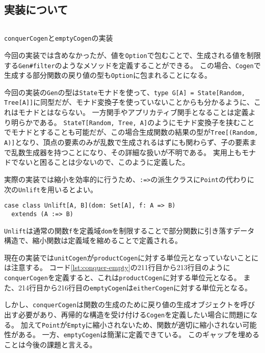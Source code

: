 \documentclass[submit,PRO]{ipsj}
\theoremstyle{definition}
\begin{document}
\subsection{実装について}

\begin{listing*}[hbt]
  \inputminted[breaklines,autogobble,linenos,firstline=211,lastline=216]{scala}{../src/main/scala/minicheck.scala}
  \caption{\texttt{conquerCogen}と\texttt{emptyCogen}の実装}
  \label{lst:conquer-empty}
\end{listing*}

今回の実装では含めなかったが、値を\texttt{Option}で包むことで、生成される値を制限する\texttt{Gen\#filter}のようなメソッドを定義することができる。
この場合、\texttt{Cogen}で生成する部分関数の戻り値の型も\texttt{Option}に包まれることになる。

今回の実装の\texttt{Gen}の型は\texttt{State}モナドを使って、\texttt{type G[A] = State[Random, Tree[A]]}に同型だが、モナド変換子を使っていないことからも分かるように、これはモナドとはならない。
一方関手やアプリカティブ関手となることは定義より明らかである。
\texttt{StateT[Random, Tree, A]}のようにモナド変換子を挟むことでモナドとすることも可能だが、この場合生成関数の結果の型が\texttt{Tree[(Random, A)]}となり、頂点の要素のみが乱数で生成されるはずにも関わらず、子の要素まで乱数生成器を持つことになり、その詳細な扱いが不明である。
実用上もモナドでないと困ることは少ないので、このように定義した。

実際の実装では縮小を効率的に行うため、\texttt{:=>}の派生クラスに\texttt{Point}の代わりに次の\texttt{Unlift}を用いるとよい。

\begin{verbatim}
case class Unlift[A, B](dom: Set[A], f: A => B)
  extends (A :=> B)
\end{verbatim}

\texttt{Unlift}は通常の関数\texttt{f}を定義域\texttt{dom}を制限することで部分関数に引き落すデータ構造で、縮小関数は定義域を縮めることで定義される。

現在の実装では\texttt{unitCogen}が\texttt{productCogen}に対する単位元となっていないことには注意する。
コード\ref{lst:conquer-empty}の211行目から213行目のように\texttt{conquerCogen}を定義すると、これは\texttt{productCogen}に対する単位元となる。
また、214行目から216行目の\texttt{emptyCogen}は\texttt{eitherCogen}に対する単位元となる。

しかし、\texttt{conquerCogen}は関数の生成のために戻り値の生成オブジェクトを呼び出す必要があり、再帰的な構造を受け付ける\texttt{Cogen}を定義したい場合に問題になる。
加えて\texttt{Point}が\texttt{Empty}に縮小されないため、関数が適切に縮小されない可能性がある。
一方、\texttt{emptyCogen}は簡潔に定義できている。
このギャップを埋めることは今後の課題と言える。
\end{document}
